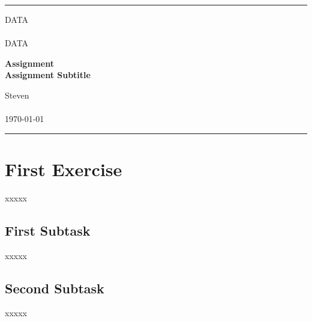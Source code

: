 \documentclass[a4paper, 11pt]{article} %
\begin{document}

\fancyhead[C]{}
\hrule \medskip %
\begin{minipage}{0.295\textwidth} %
	\raggedright
	DATA\\ %
	\footnotesize %
	\hfill\\
	DATA\\ %
\end{minipage}
\begin{minipage}{0.4\textwidth} %
	\centering
	\large %
	\textbf{Assignment}\\ %
	\normalsize %
	\textbf{Assignment Subtitle}\\ %
\end{minipage}
\begin{minipage}{0.295\textwidth} %
	\raggedleft
	Steven\\ %
	\footnotesize %
	\hfill\\
	\today\\ %
\end{minipage}
\medskip\hrule %
\bigskip


\section{\textbf{First Exercise}}
xxxxx

\subsection{\textbf{First Subtask}}
xxxxx

\subsection{\textbf{Second Subtask}}
xxxxx

\bigskip

\end{document}
